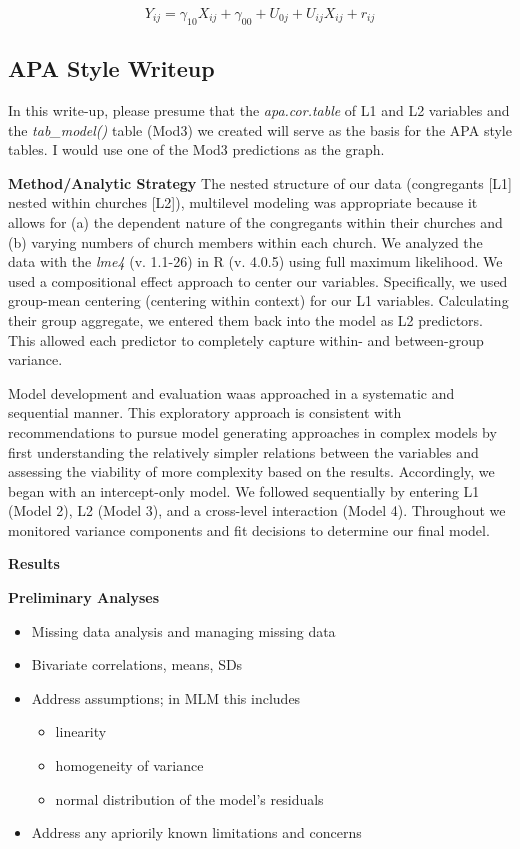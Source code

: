 \documentclass[
  english,
]{book}
\providecommand{\tightlist}{%
  \setlength{\itemsep}{0pt}\setlength{\parskip}{0pt}}
\begin{document}
\[Y_{ij}=\gamma _{10}X_{ij}+\gamma _{00}+U_{0j}+U_{ij}X_{ij}+r_{ij}\]

\hypertarget{apa-style-writeup}{%
\subsection{APA Style Writeup}\label{apa-style-writeup}}

In this write-up, please presume that the \emph{apa.cor.table} of L1 and L2 variables and the \emph{tab\_model()} table (Mod3) we created will serve as the basis for the APA style tables. I would use one of the Mod3 predictions as the graph.

\textbf{Method/Analytic Strategy}
The nested structure of our data (congregants {[}L1{]} nested within churches {[}L2{]}), multilevel modeling was appropriate because it allows for (a) the dependent nature of the congregants within their churches and (b) varying numbers of church members within each church. We analyzed the data with the \emph{lme4} (v. 1.1-26) in R (v. 4.0.5) using full maximum likelihood. We used a compositional effect \citep{enders_centering_2007} approach to center our variables. Specifically, we used group-mean centering (centering within context) for our L1 variables. Calculating their group aggregate, we entered them back into the model as L2 predictors. This allowed each predictor to completely capture within- and between-group variance.

Model development and evaluation waas approached in a systematic and sequential manner. This exploratory approach is consistent with recommendations to pursue model generating approaches in complex models \citep{bollen_testing_1993} by first understanding the relatively simpler relations between the variables \citep[e.g.,][]{hancock_hierarchical_2010, petscher_linear_2013} and assessing the viability of more complexity based on the results. Accordingly, we began with an intercept-only model. We followed sequentially by entering L1 (Model 2), L2 (Model 3), and a cross-level interaction (Model 4). Throughout we monitored variance components and fit decisions to determine our final model.

\textbf{Results}

\textbf{Preliminary Analyses}

\begin{itemize}
\tightlist
\item
  Missing data analysis and managing missing data
\item
  Bivariate correlations, means, SDs
\item
  Address assumptions; in MLM this includes

  \begin{itemize}
  \tightlist
  \item
    linearity
  \item
    homogeneity of variance
  \item
    normal distribution of the model's residuals
  \end{itemize}
\item
  Address any apriorily known limitations and concerns
\end{itemize}
\end{document}

